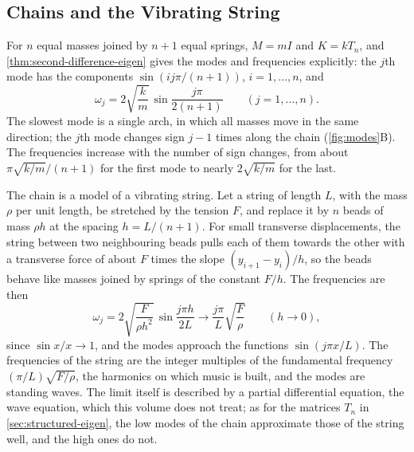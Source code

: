 \subsection{Chains and the Vibrating String}

For $n$ equal masses joined by $n+1$ equal springs, $M=mI$ and $K=kT_n$, and \cref{thm:second-difference-eigen} gives the modes and frequencies explicitly: the $j$th mode has the components $\sin(ij\pi/(n+1))$, $i=1,\ldots,n$, and
\[
\omega_j=2\sqrt{\frac km}\,\sin\frac{j\pi}{2(n+1)}\qquad(j=1,\ldots,n).
\]
The slowest mode is a single arch, in which all masses move in the same direction; the $j$th mode changes sign $j-1$ times along the chain (\cref{fig:modes}B). The frequencies increase with the number of sign changes, from about $\pi\sqrt{k/m}/(n+1)$ for the first mode to nearly $2\sqrt{k/m}$ for the last.

The chain is a model of a vibrating string. Let a string of length $L$, with the mass $\rho$ per unit length, be stretched by the tension $F$, and replace it by $n$ beads of mass $\rho h$ at the spacing $h=L/(n+1)$. For small transverse displacements, the string between two neighbouring beads pulls each of them towards the other with a transverse force of about $F$ times the slope $(y_{i+1}-y_i)/h$, so the beads behave like masses joined by springs of the constant $F/h$. The frequencies are then
\[
\omega_j=2\sqrt{\frac F{\rho h^2}}\,\sin\frac{j\pi h}{2L}\to\frac{j\pi}L\sqrt{\frac F\rho}\qquad(h\to0),
\]
since $\sin x/x\to1$, and the modes approach the functions $\sin(j\pi x/L)$. The frequencies of the string are the integer multiples of the fundamental frequency $(\pi/L)\sqrt{F/\rho}$, the harmonics on which music is built, and the modes are standing waves. The limit itself is described by a partial differential equation, the wave equation, which this volume does not treat; as for the matrices $T_n$ in \cref{sec:structured-eigen}, the low modes of the chain approximate those of the string well, and the high ones do not.

